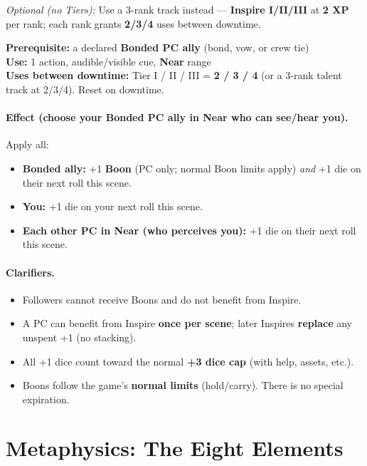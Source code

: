 \documentclass[11pt]{article}
\begin{document}
\emph{Optional (no Tiers):} Use a 3-rank track instead — \textbf{Inspire I/II/III} at \textbf{2 XP} per rank; each rank grants \textbf{2/3/4} uses between downtime.

\textbf{Prerequisite:} a declared \textbf{Bonded PC ally} (bond, vow, or crew tie) \\
\textbf{Use:} 1 action, audible/visible cue, \textbf{Near} range \\
\textbf{Uses between downtime:} Tier I / II / III = \textbf{2 / 3 / 4} (or a 3-rank talent track at 2/3/4). Reset on downtime.

\paragraph{Effect (choose your Bonded PC ally in Near who can see/hear you).}
Apply all:
\begin{itemize}
  \item \textbf{Bonded ally:} +1 \textbf{Boon} (PC only; normal Boon limits apply) \emph{and} +1 die on their next roll this scene.
  \item \textbf{You:} +1 die on your next roll this scene.
  \item \textbf{Each other PC in Near (who perceives you):} +1 die on their next roll this scene.
\end{itemize}

\paragraph{Clarifiers.}
\begin{itemize}
  \item Followers cannot receive Boons and do not benefit from Inspire.
  \item A PC can benefit from Inspire \textbf{once per scene}; later Inspires \textbf{replace} any unspent +1 (no stacking).
  \item All +1 dice count toward the normal \textbf{+3 dice cap} (with help, assets, etc.).
  \item Boons follow the game's \textbf{normal limits} (hold/carry). There is no special expiration.
\end{itemize}

\bigskip


\section{Metaphysics: The Eight Elements}
\label{sec:metaphysics}
\end{document}
